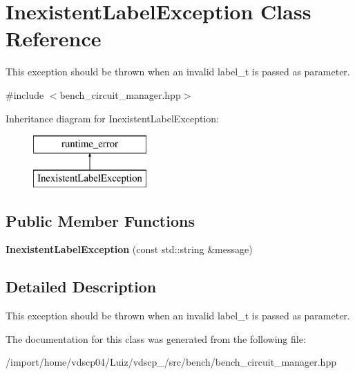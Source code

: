 \section{Inexistent\+Label\+Exception Class Reference}
\label{classInexistentLabelException}


This exception should be thrown when an invalid label\+\_\+t is passed as parameter.  




{\ttfamily \#include $<$bench\+\_\+circuit\+\_\+manager.\+hpp$>$}

Inheritance diagram for Inexistent\+Label\+Exception\+:\begin{figure}[H]
\begin{center}
\leavevmode
\includegraphics[height=2.000000cm]{classInexistentLabelException}
\end{center}
\end{figure}
\subsection*{Public Member Functions}
\begin{DoxyCompactItemize}
\item 
{\bfseries Inexistent\+Label\+Exception} (const std\+::string \&message)\label{classInexistentLabelException_a10aad583eea5fb78eb56695b80a8da27}

\end{DoxyCompactItemize}


\subsection{Detailed Description}
This exception should be thrown when an invalid label\+\_\+t is passed as parameter. 

The documentation for this class was generated from the following file\+:\begin{DoxyCompactItemize}
\item 
/import/home/vdscp04/\+Luiz/vdscp\+\_/src/bench/bench\+\_\+circuit\+\_\+manager.\+hpp\end{DoxyCompactItemize}
